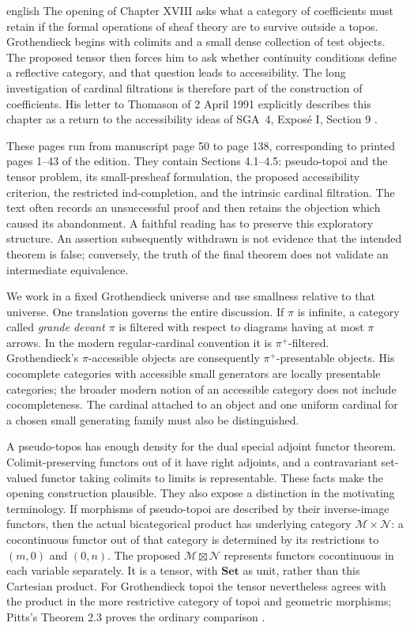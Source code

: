 \begin{otherlanguage*}{english}
\nocite{Grothendieck1990XVIII}
The opening of Chapter XVIII asks what a category of coefficients must retain if the formal operations of sheaf theory are to survive outside a topos. Grothendieck begins with colimits and a small dense collection of test objects. The proposed tensor then forces him to ask whether continuity conditions define a reflective category, and that question leads to accessibility. The long investigation of cardinal filtrations is therefore part of the construction of coefficients. His letter to Thomason of 2 April 1991 explicitly describes this chapter as a return to the accessibility ideas of SGA~4, Expos\'e I, Section 9 \citep{Grothendieck1991Letter,SGA4I1972}.

These pages run from manuscript page 50 to page 138, corresponding to printed pages 1--43 of the edition. They contain Sections 4.1--4.5: pseudo-topoi and the tensor problem, its small-presheaf formulation, the proposed accessibility criterion, the restricted ind-completion, and the intrinsic cardinal filtration. The text often records an unsuccessful proof and then retains the objection which caused its abandonment. A faithful reading has to preserve this exploratory structure. An assertion subsequently withdrawn is not evidence that the intended theorem is false; conversely, the truth of the final theorem does not validate an intermediate equivalence.

We work in a fixed Grothendieck universe and use smallness relative to that universe. One translation governs the entire discussion. If $\pi$ is infinite, a category called \emph{grande devant $\pi$} is filtered with respect to diagrams having at most $\pi$ arrows. In the modern regular-cardinal convention it is $\pi^+$-filtered. Grothendieck's $\pi$-accessible objects are consequently $\pi^+$-presentable objects. His cocomplete categories with accessible small generators are locally presentable categories; the broader modern notion of an accessible category does not include cocompleteness. The cardinal attached to an object and one uniform cardinal for a chosen small generating family must also be distinguished.

A pseudo-topos has enough density for the dual special adjoint functor theorem. Colimit-preserving functors out of it have right adjoints, and a contravariant set-valued functor taking colimits to limits is representable. These facts make the opening construction plausible. They also expose a distinction in the motivating terminology. If morphisms of pseudo-topoi are described by their inverse-image functors, then the actual bicategorical product has underlying category $\mathcal M\times\mathcal N$: a cocontinuous functor out of that category is determined by its restrictions to $(m,0)$ and $(0,n)$. The proposed $\mathcal M\boxtimes\mathcal N$ represents functors cocontinuous in each variable separately. It is a tensor, with $\mathbf{Set}$ as unit, rather than this Cartesian product. For Grothendieck topoi the tensor nevertheless agrees with the product in the more restrictive category of topoi and geometric morphisms; Pitts's Theorem 2.3 proves the ordinary comparison \citep{Pitts1985}.


\end{otherlanguage*}

